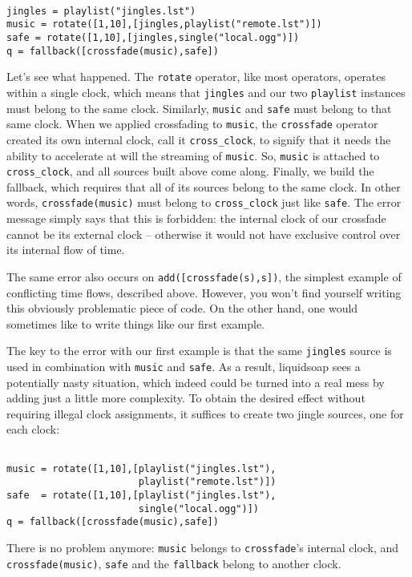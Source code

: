 \begin{verbatim}

jingles = playlist("jingles.lst")
music = rotate([1,10],[jingles,playlist("remote.lst")])
safe = rotate([1,10],[jingles,single("local.ogg")])
q = fallback([crossfade(music),safe])
\end{verbatim}
Let's see what happened.
The \verb+rotate+ operator, like most operators, operates
within a single clock, which means that \verb+jingles+
and our two \verb+playlist+ instances must belong to the same clock.
Similarly, \verb+music+ and \verb+safe+ must belong to that
same clock.
When we applied crossfading to \verb+music+,
the \verb+crossfade+ operator created its own internal clock,
call it \verb+cross_clock+,
to signify that it needs the ability to accelerate at will the
streaming of \verb+music+.
So, \verb+music+ is attached to \verb+cross_clock+,
and all sources built above come along.
Finally, we build the fallback, which requires that all of its
sources belong to the same clock.
In other words, \verb+crossfade(music)+ must belong
to \verb+cross_clock+ just like \verb+safe+.
The error message simply says that this is forbidden: the internal
clock of our crossfade cannot be its external clock -- otherwise
it would not have exclusive control over its internal flow of time.

The same error also occurs on \verb+add([crossfade(s),s])+,
the simplest example of conflicting time flows, described above.
However, you won't find yourself writing this obviously problematic
piece of code. On the other hand, one would sometimes like to
write things like our first example.

The key to the error with our first example is that the same
\verb+jingles+ source is used in combination with \verb+music+
and \verb+safe+. As a result, liquidsoap sees a potentially
nasty situation, which indeed could be turned into a real mess
by adding just a little more complexity. To obtain the desired effect
without requiring illegal clock assignments, it suffices to
create two jingle sources, one for each clock:

\begin{verbatim}

music = rotate([1,10],[playlist("jingles.lst"),
                       playlist("remote.lst")])
safe  = rotate([1,10],[playlist("jingles.lst"),
                       single("local.ogg")])
q = fallback([crossfade(music),safe])
\end{verbatim}
There is no problem anymore: \verb+music+ belongs to 
\verb+crossfade+'s internal clock, and \verb+crossfade(music)+,
\verb+safe+ and the \verb+fallback+ belong to another clock.

